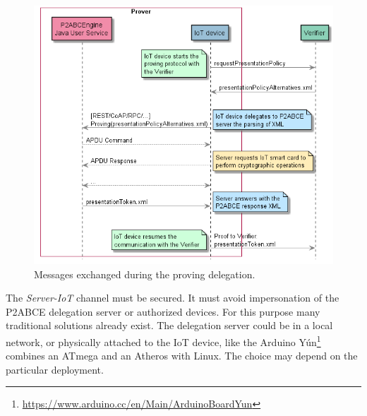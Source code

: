 \begin{figure}[bth]
	\begin{center}
		\includegraphics[width=\linewidth]{gfx/UML/provingDelegation}
	\end{center}
	\caption{Messages exchanged during the proving delegation.}
	\label{fig:DelegationProving}
\end{figure}



The \textit{Server-IoT} channel must be secured. It must avoid impersonation of the P2ABCE delegation server or authorized devices. For this purpose many traditional solutions already exist. The delegation server could be in a local network, or physically attached to the IoT device, like the Arduino Y\'un\footnote{\url{https://www.arduino.cc/en/Main/ArduinoBoardYun}} combines an ATmega and an Atheros with Linux. The choice may depend on the particular deployment.



